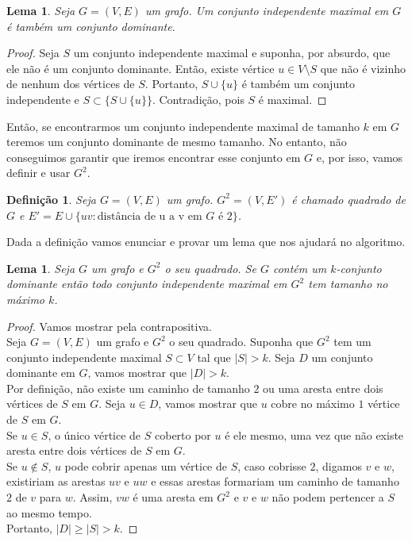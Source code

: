 \documentclass[12pt]{article}
\newtheorem{lemma}[theorem]{Lema}
\newtheorem{definition}[theorem]{Definição}
\begin{document}
\begin{lemma}\label{lemma:2.7}
    Seja $G = (V,E)$ um grafo. Um conjunto independente maximal em $G$ é também um conjunto dominante.
\end{lemma}
\begin{proof}
    Seja $S$ um conjunto independente maximal e suponha, por absurdo, que ele não é um conjunto dominante. Então, existe vértice $u \in V \setminus S$ que não é vizinho de nenhum dos vértices de $S$. Portanto, $S \cup \{u\}$ é também um conjunto independente e $S \subset \{S \cup \{u\}\}$. Contradição, pois $S$ é maximal.
\end{proof}
Então, se encontrarmos um conjunto independente maximal de tamanho $k$ em $G$ teremos um conjunto dominante de mesmo tamanho. No entanto, não conseguimos garantir que iremos encontrar esse conjunto em $G$ e, por isso, vamos definir e usar $G^2$.
\begin{definition}
    Seja $G= (V,E)$ um grafo. $G^2 = (V,E')$ é chamado \emph{quadrado} de $G$ e $E' = E \cup \{uv: \text{distância de u a v em $G$ é $2$}\}$.
\end{definition}
Dada a definição vamos enunciar e provar um lema que nos ajudará no algoritmo.
\begin{lemma}\label{lemma:2.9}
    Seja $G$ um grafo e $G^2$ o seu quadrado. Se $G$ contém um $k$-conjunto dominante então todo conjunto independente maximal em $G^2$ tem tamanho no máximo $k$.
\end{lemma}
\begin{proof}
    Vamos mostrar pela contrapositiva.\\
    Seja $G = (V,E)$ um grafo e $G^2$ o seu quadrado. Suponha que $G^2$ tem um conjunto independente maximal $S \subset V$ tal que $|S| > k$. Seja $D$ um conjunto dominante em $G$, vamos mostrar que $|D| > k$. \\
    Por definição, não existe um caminho de tamanho $2$ ou uma aresta entre dois vértices de $S$ em $G$. Seja $u \in D$, vamos mostrar que $u$ cobre no máximo $1$ vértice de $S$ em $G$. \\
    Se $u \in S$, o único vértice de $S$ coberto por $u$ é ele mesmo, uma vez que não existe aresta entre dois vértices de $S$ em $G$. \\
    Se $u \not \in S$, $u$ pode cobrir apenas um vértice de $S$, caso cobrisse $2$, digamos $v$ e $w$, existiriam as arestas $uv$ e $uw$ e essas arestas formariam um caminho de tamanho $2$ de $v$ para $w$. Assim, $vw$ é uma aresta em $G^2$ e $v$ e $w$ não podem pertencer a $S$ ao mesmo tempo. \\
    Portanto, $|D| \geq |S| > k$.
\end{proof}
\end{document}

